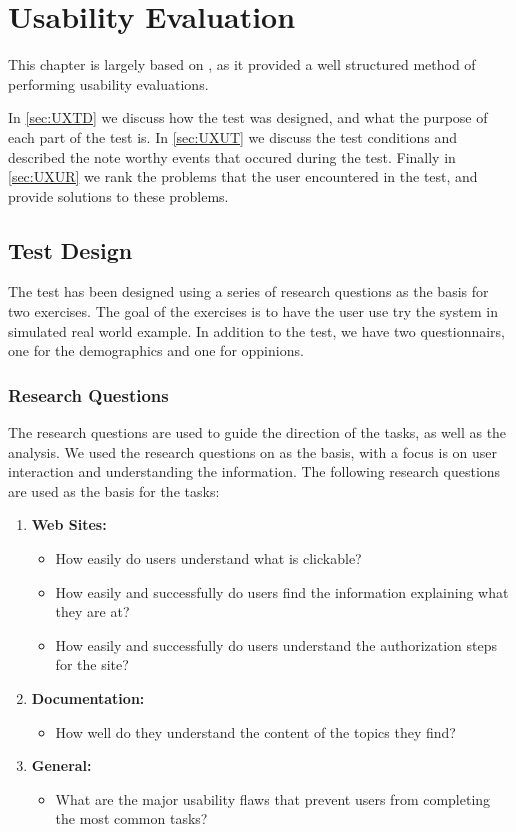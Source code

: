 \chapter{Usability Evaluation}\label{cha:usability}

This chapter is largely based on \citep[p. 65-72 and 269-275]{UXBook}, as
it provided a well structured method of performing usability evaluations.

In \autoref{sec:UXTD} we discuss how the test was designed, and what the
purpose of each part of the test is. In \autoref{sec:UXUT} we discuss the test
conditions and described the note worthy events that occured during the test.
Finally in \autoref{sec:UXUR} we rank the problems that the user encountered in
the test, and provide solutions to these problems.


\section{Test Design}\label{sec:UXTD}
The test has been designed using a series of research questions as the basis
for two exercises. The goal of the exercises is to have the user use try the
system in simulated real world example. In addition to the test, we have two
questionnairs, one for the demographics and one for oppinions.

\subsection{Research Questions}\label{subsec:UXRQ}
The research questions are used to guide the direction of the tasks, as well as
the analysis. We used the research questions on \citep[p. 70-71]{UXBook} as the
basis, with a focus is on user interaction and understanding the information.
The following research questions are used as the basis for the tasks:

\begin{enumerate}
  \item \textbf{Web Sites:} 
	\begin{itemize}
      \item How easily do users understand what is clickable?
      \item How easily and successfully do users find the information
      explaining what they are at?
      \item How easily and successfully do users understand the authorization
      steps for the site?
    \end{itemize}
  \item \textbf{Documentation:}
    \begin{itemize}
      \item How well do they understand the content of the topics they find?
    \end{itemize}
  \item \textbf{General:}
    \begin{itemize}
      \item What are the major usability flaws that prevent users from
      completing the most common tasks?
    \end{itemize}
\end{enumerate}

